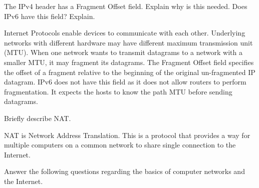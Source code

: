 \documentclass[answers,addpoints]{exam}
\begin{document}
\begin{questions}
\question
The IPv4 header has a Fragment Offset field. Explain why is this needed. Does IPv6 have this field? Explain.
\fillwithdottedlines{1in}
\begin{solution} 
Internet Protocols enable devices to communicate with each other. Underlying networks with different hardware may have different maximum transmission unit (MTU). When one network wants to transmit datagrams to a network with a smaller MTU, it may fragment its datagrams. The Fragment Offset field specifies the offset of a fragment relative to the beginning of the original un-fragmented IP datagram. 
IPv6 does not have this field as it does not allow routers to perform fragmentation. It expects the hosts to know the path MTU before sending datagrams.
\end{solution}

\question Briefly describe NAT.
\fillwithdottedlines{1in}
\begin{solution} 
NAT is Network Address Translation. This is a protocol that provides a way for multiple computers on a common network to share single connection to the Internet.
\end{solution}

\newpage
\question 
Answer the following questions regarding the basics of computer networks and the Internet.




\end{questions}
\end{document}
